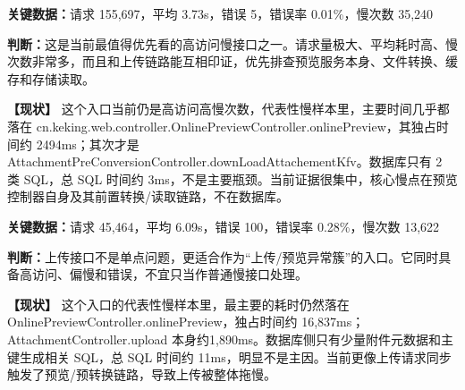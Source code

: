 \noindent\textbf{关键数据：}请求 155,697，平均 3.73s，错误 5，错误率 0.01\%，慢次数 35,240\par

\noindent\textbf{判断：}这是当前最值得优先看的高访问慢接口之一。请求量极大、平均耗时高、慢次数非常多，而且和上传链路能互相印证，优先排查预览服务本身、文件转换、缓存和存储读取。\par

\vspace{0.25em}

\noindent\textbf{【现状】} 这个入口当前仍是高访问高慢次数，代表性慢样本里，主要时间几乎都落在 cn.keking.web.controller.OnlinePreviewController.onlinePreview，其独占时间约 2494ms；其次才是 AttachmentPreConversionController.downLoadAttachementKfv。数据库只有 2 类 SQL，总 SQL 时间约 3ms，不是主要瓶颈。当前证据很集中，核心慢点在预览控制器自身及其前置转换/读取链路，不在数据库。\par

\vspace{0.35em}\par

\noindent\textbf{关键数据：}请求 45,464，平均 6.09s，错误 100，错误率 0.28\%，慢次数 13,622\par

\noindent\textbf{判断：}上传接口不是单点问题，更适合作为“上传/预览异常簇”的入口。它同时具备高访问、偏慢和错误，不宜只当作普通慢接口处理。\par

\vspace{0.25em}

\noindent\textbf{【现状】} 这个入口的代表性慢样本里，最主要的耗时仍然落在 OnlinePreviewController.onlinePreview，独占时间约 16,837ms；AttachmentController.upload 本身约1,890ms。数据库侧只有少量附件元数据和主键生成相关 SQL，总 SQL 时间约 11ms，明显不是主因。当前更像上传请求同步触发了预览/预转换链路，导致上传被整体拖慢。\par

\vspace{0.35em}\par

